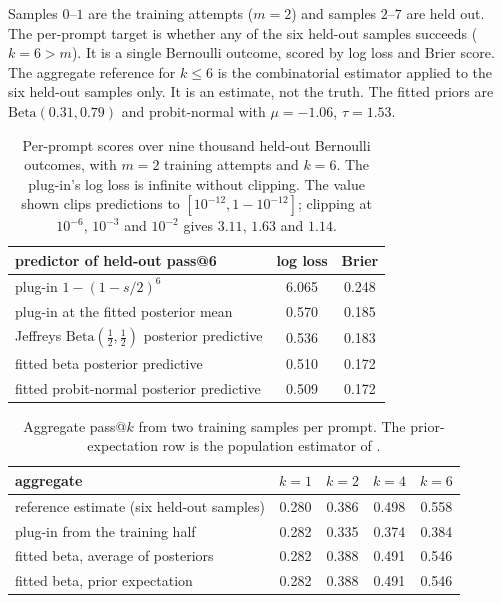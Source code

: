 \documentclass[11pt]{article}
\theoremstyle{itheads}
\begin{document}
Samples $0$--$1$ are the training attempts ($m=2$) and samples
$2$--$7$ are held out. The per-prompt target is whether any of the
six held-out samples succeeds ($k = 6 > m$). It is a single
Bernoulli outcome, scored by log loss and Brier score. The aggregate
reference for $k \le 6$ is the combinatorial estimator applied to
the six held-out samples only. It is an estimate, not the truth. The
fitted priors are $\mathrm{Beta}(0.31, 0.79)$ and probit-normal with
$\mu = -1.06$, $\tau = 1.53$.

\begin{table}[h]
\centering
\begin{tabular}{lcc}
\toprule
predictor of held-out pass@6 & log loss & Brier \\
\midrule
plug-in $1-(1-s/2)^6$ & 6.065 & 0.248 \\
plug-in at the fitted posterior mean & 0.570 & 0.185 \\
Jeffreys $\mathrm{Beta}(\tfrac12,\tfrac12)$ posterior predictive
  & 0.536 & 0.183 \\
fitted beta posterior predictive & 0.510 & 0.172 \\
fitted probit-normal posterior predictive & 0.509 & 0.172 \\
\bottomrule
\end{tabular}
\caption{Per-prompt scores over nine thousand held-out Bernoulli
outcomes, with $m=2$ training attempts and $k=6$. The plug-in's log
loss is infinite without clipping. The value shown clips predictions
to $[10^{-12}, 1-10^{-12}]$; clipping at $10^{-6}$, $10^{-3}$ and
$10^{-2}$ gives $3.11$, $1.63$ and $1.14$.}
\label{tab:perprompt}
\end{table}

\begin{table}[h]
\centering
\begin{tabular}{lcccc}
\toprule
aggregate & $k=1$ & $k=2$ & $k=4$ & $k=6$ \\
\midrule
reference estimate (six held-out samples) & 0.280 & 0.386 & 0.498
  & 0.558 \\
plug-in from the training half & 0.282 & 0.335 & 0.374 & 0.384 \\
fitted beta, average of posteriors & 0.282 & 0.388 & 0.491 & 0.546 \\
fitted beta, prior expectation & 0.282 & 0.388 & 0.491 & 0.546 \\
\bottomrule
\end{tabular}
\caption{Aggregate pass@$k$ from two training samples per prompt.
The prior-expectation row is the population estimator of
\citet{kazdan2025}.}
\label{tab:aggregate}
\end{table}
\end{document}
